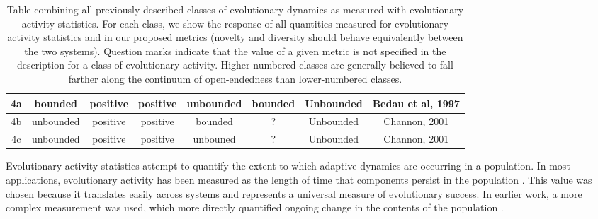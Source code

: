 \documentclass[letterpaper]{article}
\begin{document}
\begin{table}[]
\begin{tabular}{|c|c|c|c|c|c|c|c|}
4a             & bounded                                                                                   & positive        & positive                                                             & unbounded                                                          & bounded                  & Unbounded                                                                                 & Bedau et al, 1997     \\ \hline
4b             & unbounded                                                                                 & positive        & positive                                                             & bounded                                                            & ?                   & Unbounded                                                                                 & Channon, 2001         \\ \hline
4c             & unbounded                                                                                 & positive        & positive                                                             & unbouned                                                           & ?                   & Unbounded                                                                                 & Channon, 2001         \\ \hline
\end{tabular}
\caption{Table combining all previously described classes of evolutionary dynamics as measured with evolutionary activity statistics. For each class, we show the response of all quantities measured for evolutionary activity statistics and in our proposed metrics (novelty and diversity should behave equivalently between the two systems). Question marks indicate that the value of a given metric is not specified in the description for a class of evolutionary activity. Higher-numbered classes are generally believed to fall farther along the continuum of open-endedness than lower-numbered classes.}
\label{eastats}
\end{table}

Evolutionary activity statistics attempt
to quantify the extent to which adaptive dynamics are occurring in a population. In most applications, evolutionary activity has been measured as the length of time that components persist in the population \citep{bedau_comparison_1997, bedau_classification_1998, channon_improving_2003}. This value was chosen because it translates easily across systems and %
represents a universal measure of evolutionary success.
In earlier work, a more complex measurement was used, which more directly quantified ongoing change in the contents of the population \citep{langton_measurement_1992}. 
\end{document}
